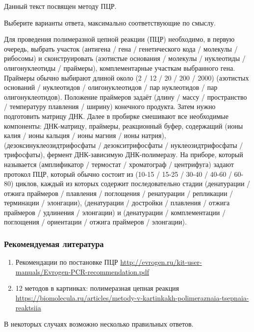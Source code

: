 
Данный текст посвящен методу ПЦР.

Выберите варианты ответа, максимально соответствующие по смыслу.

Для проведения полимеразной цепной реакции (ПЦР) необходимо, в первую очередь, выбрать участок 
(антигена / гена / генетического кода / молекулы / рибосомы) и сконструировать 
(азотистые основания / молекулы / нуклеотиды / олигонуклеотиды / праймеры), комплементарные участкам выбранного гена. Праймеры обычно выбирают длиной около 
(2 / 12 / 20 / 200 / 2000) (азотистых оснований / нуклеотидов / олигонуклеотидов / пар нуклеотидов / пар олигонуклеотидов). Положение праймеров задаёт 
(длину / массу / пространство / температуру плавления / ширину) конечного продукта. Затем нужно подготовить матрицу ДНК. Далее в пробирке смешивают все необходимые компоненты: ДНК-матрицу, праймеры, реакционный буфер, содержащий 
(ионы калия / ионы кальция / ионы магния / ионы натрия), (дезоксинуклеозидтрифосфаты / дезокситрифосфаты / нуклеозидтрифосфаты / трифосфаты), фермент ДНК-зависимую ДНК-полимеразу. На приборе, который называется 
(амплификатор / термостат / хроматограф / центрифуга) задают протокол ПЦР, который обычно состоит из 
(10-15 / 15-25 / 30-40 / 40-60 / 60-80)  циклов, каждый из которых содержит последовательно стадии 
(денатурации / отжига праймеров / плавления / поглощения / ренатурации / репликации / терминации / элонгации), 
(денатурации / достройки / плавления / отжига праймеров / удлинения / элонгации) и 
(денатурации / комплементации / поглощения / ориентации / отжига праймеров / элонгации).
\subsubsection*{Рекомендуемая литература}

\begin{enumerate}
    \item Рекомендации по постановке ПЦР \url{http://evrogen.ru/kit-user-manuals/Evrogen-PCR-recommendation.pdf}
    \item 12 методов в картинках: полимеразная цепная реакция \url{https://biomolecula.ru/articles/metody-v-kartinkakh-polimeraznaia-tsepnaia-reaktsiia}
\end{enumerate}

\explanationSection

В некоторых случаях возможно несколько правильных ответов.


